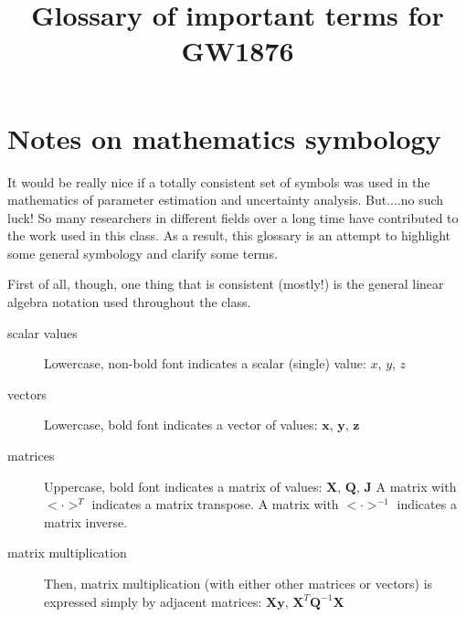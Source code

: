 \documentclass[english]{article}
\begin{document}
\title{Glossary of important terms for GW1876}
\maketitle

\section*{Notes on mathematics symbology}
It would be really nice if a totally consistent set of symbols was used in the mathematics of parameter estimation and uncertainty analysis. But....no such luck! So many researchers in different fields over a long time have contributed to the work used in this class. As a result, this glossary is an attempt to highlight some general symbology and clarify some terms.

First of all, though, one thing that is consistent (mostly!) is the general linear algebra notation used throughout the class.
\begin{description}
\item[scalar values] Lowercase, non-bold font indicates a scalar (single) value: $x$, $y$, $z$
\item[vectors] Lowercase, bold font indicates a vector of values: $\mathbf{x}$, $\mathbf{y}$, $\mathbf{z}$ 
\item[matrices] Uppercase, bold font indicates a matrix of values: $\mathbf{X}$, $\mathbf{Q}$, $\mathbf{J}$ A matrix with $<\cdot>^{T}$ indicates a matrix transpose. A matrix with $<\cdot>^{-1}$ indicates a matrix inverse.
\item[matrix multiplication] Then, matrix multiplication (with either other matrices or vectors) is expressed simply by adjacent matrices: $\mathbf{Xy}$, $\mathbf{X}^T\mathbf{Q}^{-1}\mathbf{X}$
\end{description}
\end{document}
